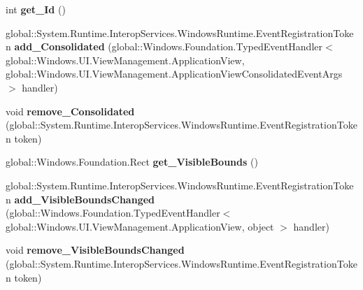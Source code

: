 \begin{DoxyCompactItemize}
int {\bfseries get\+\_\+\+Id} ()
\item 
\mbox{\label{class_windows_1_1_u_i_1_1_view_management_1_1_application_view_a0ffeec110a4a66c247c6e2a9b4be797b}} 
global\+::\+System.\+Runtime.\+Interop\+Services.\+Windows\+Runtime.\+Event\+Registration\+Token {\bfseries add\+\_\+\+Consolidated} (global\+::\+Windows.\+Foundation.\+Typed\+Event\+Handler$<$ global\+::\+Windows.\+U\+I.\+View\+Management.\+Application\+View, global\+::\+Windows.\+U\+I.\+View\+Management.\+Application\+View\+Consolidated\+Event\+Args $>$ handler)
\item 
\mbox{\label{class_windows_1_1_u_i_1_1_view_management_1_1_application_view_a1c5d2a3b58064582c6456f48994b44d6}} 
void {\bfseries remove\+\_\+\+Consolidated} (global\+::\+System.\+Runtime.\+Interop\+Services.\+Windows\+Runtime.\+Event\+Registration\+Token token)
\item 
\mbox{\label{class_windows_1_1_u_i_1_1_view_management_1_1_application_view_aee267cf0554bac921b2c6c10392310b7}} 
global\+::\+Windows.\+Foundation.\+Rect {\bfseries get\+\_\+\+Visible\+Bounds} ()
\item 
\mbox{\label{class_windows_1_1_u_i_1_1_view_management_1_1_application_view_a1a4e9c3942d4eb2602fdeb123ed6f77a}} 
global\+::\+System.\+Runtime.\+Interop\+Services.\+Windows\+Runtime.\+Event\+Registration\+Token {\bfseries add\+\_\+\+Visible\+Bounds\+Changed} (global\+::\+Windows.\+Foundation.\+Typed\+Event\+Handler$<$ global\+::\+Windows.\+U\+I.\+View\+Management.\+Application\+View, object $>$ handler)
\item 
\mbox{\label{class_windows_1_1_u_i_1_1_view_management_1_1_application_view_a3c9197225cd620a40c58179a49da3349}} 
void {\bfseries remove\+\_\+\+Visible\+Bounds\+Changed} (global\+::\+System.\+Runtime.\+Interop\+Services.\+Windows\+Runtime.\+Event\+Registration\+Token token)
\item 
\mbox{\label{class_windows_1_1_u_i_1_1_view_management_1_1_application_view_ab9b05a73da58fd42c06c39c87d3292d8}} 

\end{DoxyCompactItemize}
